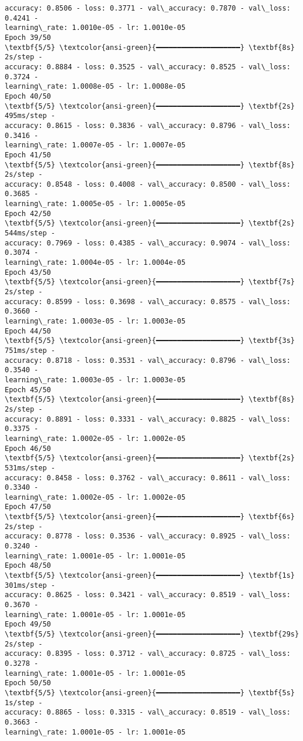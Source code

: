 \documentclass[11pt]{article}
\begin{document}
\begin{Verbatim}[commandchars=\\\{\}]
accuracy: 0.8506 - loss: 0.3771 - val\_accuracy: 0.7870 - val\_loss: 0.4241 -
learning\_rate: 1.0010e-05 - lr: 1.0010e-05
Epoch 39/50
\textbf{5/5} \textcolor{ansi-green}{━━━━━━━━━━━━━━━━━━━━} \textbf{8s} 2s/step -
accuracy: 0.8884 - loss: 0.3525 - val\_accuracy: 0.8525 - val\_loss: 0.3724 -
learning\_rate: 1.0008e-05 - lr: 1.0008e-05
Epoch 40/50
\textbf{5/5} \textcolor{ansi-green}{━━━━━━━━━━━━━━━━━━━━} \textbf{2s} 495ms/step -
accuracy: 0.8615 - loss: 0.3836 - val\_accuracy: 0.8796 - val\_loss: 0.3416 -
learning\_rate: 1.0007e-05 - lr: 1.0007e-05
Epoch 41/50
\textbf{5/5} \textcolor{ansi-green}{━━━━━━━━━━━━━━━━━━━━} \textbf{8s} 2s/step -
accuracy: 0.8548 - loss: 0.4008 - val\_accuracy: 0.8500 - val\_loss: 0.3685 -
learning\_rate: 1.0005e-05 - lr: 1.0005e-05
Epoch 42/50
\textbf{5/5} \textcolor{ansi-green}{━━━━━━━━━━━━━━━━━━━━} \textbf{2s} 544ms/step -
accuracy: 0.7969 - loss: 0.4385 - val\_accuracy: 0.9074 - val\_loss: 0.3074 -
learning\_rate: 1.0004e-05 - lr: 1.0004e-05
Epoch 43/50
\textbf{5/5} \textcolor{ansi-green}{━━━━━━━━━━━━━━━━━━━━} \textbf{7s} 2s/step -
accuracy: 0.8599 - loss: 0.3698 - val\_accuracy: 0.8575 - val\_loss: 0.3660 -
learning\_rate: 1.0003e-05 - lr: 1.0003e-05
Epoch 44/50
\textbf{5/5} \textcolor{ansi-green}{━━━━━━━━━━━━━━━━━━━━} \textbf{3s} 751ms/step -
accuracy: 0.8718 - loss: 0.3531 - val\_accuracy: 0.8796 - val\_loss: 0.3540 -
learning\_rate: 1.0003e-05 - lr: 1.0003e-05
Epoch 45/50
\textbf{5/5} \textcolor{ansi-green}{━━━━━━━━━━━━━━━━━━━━} \textbf{8s} 2s/step -
accuracy: 0.8891 - loss: 0.3331 - val\_accuracy: 0.8825 - val\_loss: 0.3375 -
learning\_rate: 1.0002e-05 - lr: 1.0002e-05
Epoch 46/50
\textbf{5/5} \textcolor{ansi-green}{━━━━━━━━━━━━━━━━━━━━} \textbf{2s} 531ms/step -
accuracy: 0.8458 - loss: 0.3762 - val\_accuracy: 0.8611 - val\_loss: 0.3340 -
learning\_rate: 1.0002e-05 - lr: 1.0002e-05
Epoch 47/50
\textbf{5/5} \textcolor{ansi-green}{━━━━━━━━━━━━━━━━━━━━} \textbf{6s} 2s/step -
accuracy: 0.8778 - loss: 0.3536 - val\_accuracy: 0.8925 - val\_loss: 0.3240 -
learning\_rate: 1.0001e-05 - lr: 1.0001e-05
Epoch 48/50
\textbf{5/5} \textcolor{ansi-green}{━━━━━━━━━━━━━━━━━━━━} \textbf{1s} 301ms/step -
accuracy: 0.8625 - loss: 0.3421 - val\_accuracy: 0.8519 - val\_loss: 0.3670 -
learning\_rate: 1.0001e-05 - lr: 1.0001e-05
Epoch 49/50
\textbf{5/5} \textcolor{ansi-green}{━━━━━━━━━━━━━━━━━━━━} \textbf{29s} 2s/step -
accuracy: 0.8395 - loss: 0.3712 - val\_accuracy: 0.8725 - val\_loss: 0.3278 -
learning\_rate: 1.0001e-05 - lr: 1.0001e-05
Epoch 50/50
\textbf{5/5} \textcolor{ansi-green}{━━━━━━━━━━━━━━━━━━━━} \textbf{5s} 1s/step -
accuracy: 0.8865 - loss: 0.3315 - val\_accuracy: 0.8519 - val\_loss: 0.3663 -
learning\_rate: 1.0001e-05 - lr: 1.0001e-05
    \end{Verbatim}
\end{document}
